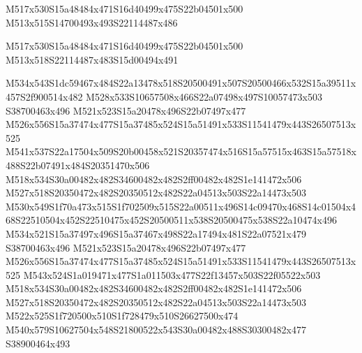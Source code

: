 \documentclass{article}
\begin{document}
\begin{multicols}{2}
\begin{center}
M517x530S15a48484x471S16d40499x475S22b04501x500 M513x515S14700493x493S22114487x486 
\end{center}









\begin{center}
M517x530S15a48484x471S16d40499x475S22b04501x500 M513x518S22114487x483S15d00494x491 
\end{center}


M534x543S1dc59467x484S22a13478x518S20500491x507S20500466x532S15a39511x457S2f900514x482 M528x533S10657508x466S22a07498x497S10057473x503 S38700463x496 M521x523S15a20478x496S22b07497x477 M526x556S15a37474x477S15a37485x524S15a51491x533S11541479x443S26507513x525 M541x537S22a17504x509S20b00458x521S20357474x516S15a57515x463S15a57518x488S22b07491x484S20351470x506 M518x534S30a00482x482S34600482x482S2ff00482x482S1e141472x506 M527x518S20350472x482S20350512x482S22a04513x503S22a14473x503 M530x549S1f70a473x515S1f702509x515S22a00511x496S14c09470x468S14c01504x468S22510504x452S22510475x452S20500511x538S20500475x538S22a10474x496 M534x521S15a37497x496S15a37467x498S22a17494x481S22a07521x479 S38700463x496 M521x523S15a20478x496S22b07497x477 M526x556S15a37474x477S15a37485x524S15a51491x533S11541479x443S26507513x525 M543x524S1a019471x477S1a011503x477S22f13457x503S22f05522x503 M518x534S30a00482x482S34600482x482S2ff00482x482S1e141472x506 M527x518S20350472x482S20350512x482S22a04513x503S22a14473x503 M522x525S1f720500x510S1f728479x510S26627500x474 M540x579S10627504x548S21800522x543S30a00482x488S30300482x477 S38900464x493


\end{multicols}
\end{document}
